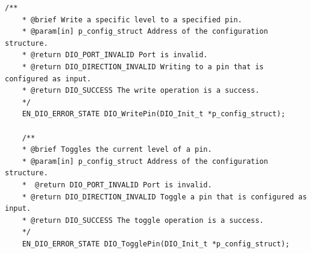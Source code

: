 \documentclass[10pt]{article}
\begin{document}
\begin{lstlisting}[style=CStyle,escapeinside=``]
	/**
	* @brief Write a specific level to a specified pin.
	* @param[in] p_config_struct Address of the configuration structure.
	* @return DIO_PORT_INVALID Port is invalid.
	* @return DIO_DIRECTION_INVALID Writing to a pin that is configured as input.
	* @return DIO_SUCCESS The write operation is a success.
	*/
	EN_DIO_ERROR_STATE DIO_WritePin(DIO_Init_t *p_config_struct);
	
	/**
	* @brief Toggles the current level of a pin.
	* @param[in] p_config_struct Address of the configuration structure.
	*  @return DIO_PORT_INVALID Port is invalid.
	* @return DIO_DIRECTION_INVALID Toggle a pin that is configured as input.
	* @return DIO_SUCCESS The toggle operation is a success.
	*/
	EN_DIO_ERROR_STATE DIO_TogglePin(DIO_Init_t *p_config_struct);
\end{lstlisting}
\end{document}

